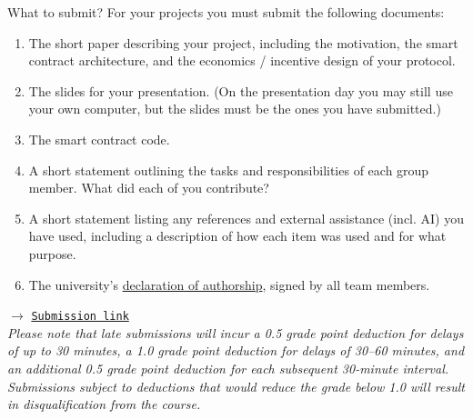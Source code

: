\documentclass[handout]{beamer}
\begin{document}
\begin{frame}{What to submit?}
\label{SUBMISSION}
\footnotesize
	For your projects you must \color{focus}submit the following documents\color{black}:
	\begin{enumerate}
		\item The \color{focus}short paper \color{black} describing your project, including the motivation, the smart contract architecture, and the economics / incentive design of your protocol.
		\item The \color{focus} slides \color{black} for your presentation. (On the presentation day you may still use your own computer, but the slides must be the ones you have submitted.)
		\item The \color{focus}smart contract code\color{black}.
		\item A short statement outlining the \color{focus}tasks and responsibilities of each group member\color{black}. What did each of you contribute?
		\item A short statement \color{focus}listing any references and external assistance (incl. AI) \color{black} you have used, including a description of how each item was used and for what purpose. 
		\item The university's \color{focus} \link \href{https://wwz.unibas.ch/fileadmin/user_upload/wwz/01_Studiendekanat/01_Publikationen/01_04_Formulare/2024_Eigenstaendigkeitserklaerung_EN.pdf}{declaration of authorship}\color{black}, signed by all team members.
	\end{enumerate}
	
	$\rightarrow$ \href{mailto:f.schaer@unibas.ch?cc=yuan.feng@unibas.ch&subject=SCDF Project Submission}{\texttt{Submission link}} \\

\scriptsize{ \textit{Please note that late submissions will incur a 0.5 grade point deduction for delays of up to 30 minutes, a 1.0 grade point deduction for delays of 30–60 minutes, and an additional 0.5 grade point deduction for each subsequent 30-minute interval. Submissions subject to deductions that would reduce the grade below 1.0 will result in disqualification from the course.}}
	
\end{frame}
\end{document}
